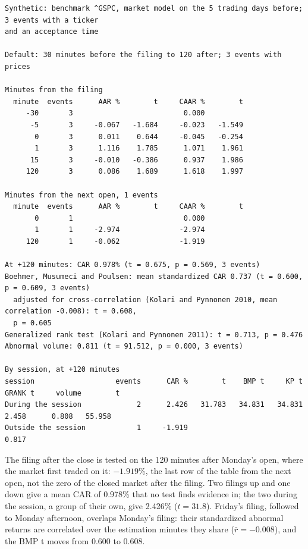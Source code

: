 \begingroup\footnotesize
\begin{verbatim}
Synthetic: benchmark ^GSPC, market model on the 5 trading days before; 3 events with a ticker
and an acceptance time

Default: 30 minutes before the filing to 120 after; 3 events with prices

Minutes from the filing
  minute  events      AAR %        t     CAAR %        t
     -30       3                          0.000
      -5       3     -0.067   -1.684     -0.023   -1.549
       0       3      0.011    0.644     -0.045   -0.254
       1       3      1.116    1.785      1.071    1.961
      15       3     -0.010   -0.386      0.937    1.986
     120       3      0.086    1.689      1.618    1.997

Minutes from the next open, 1 events
  minute  events      AAR %        t     CAAR %        t
       0       1                          0.000
       1       1     -2.974              -2.974
     120       1     -0.062              -1.919

At +120 minutes: CAR 0.978% (t = 0.675, p = 0.569, 3 events)
Boehmer, Musumeci and Poulsen: mean standardized CAR 0.737 (t = 0.600, p = 0.609, 3 events)
  adjusted for cross-correlation (Kolari and Pynnonen 2010, mean correlation -0.008): t = 0.608,
  p = 0.605
Generalized rank test (Kolari and Pynnonen 2011): t = 0.713, p = 0.476
Abnormal volume: 0.811 (t = 91.512, p = 0.000, 3 events)

By session, at +120 minutes
session                   events      CAR %        t    BMP t     KP t  GRANK t     volume        t
During the session             2      2.426   31.783   34.831   34.831    2.458      0.808   55.958
Outside the session            1     -1.919                                          0.817
\end{verbatim}
\endgroup

The filing after the close is tested on the 120 minutes after Monday's open, where the market first traded on it:
$-1.919$\%, the last row of the table from the next open, not the zero of the closed market after the filing. Two
filings up and one down give a mean CAR of 0.978\% that no test finds evidence in; the two during the session, a group
of their own, give 2.426\% ($t = 31.8$). Friday's filing, followed to Monday afternoon, overlaps Monday's filing: their
standardized abnormal returns are correlated over the estimation minutes they share ($\bar r = -0.008$), and the BMP t
moves from 0.600 to 0.608.

